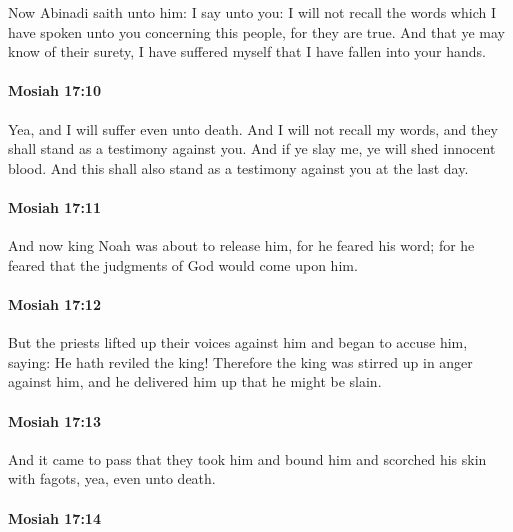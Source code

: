 			Now Abinadi saith unto him:
			I say unto you:
			I will not recall the words
			which I have spoken unto you concerning this people,
			for they are true.
			And that ye may know of their surety,
			I have suffered myself that I have fallen into your hands.

		\paragraph{Mosiah 17:10} %
			\label{MOSIAH-17-10}

			Yea, and I will suffer even unto death.
			And I will not recall my words,
			and they shall stand as a testimony against you.
			And if ye slay me, ye will shed innocent blood.
			And this shall also stand as a testimony against you at the last day.

		\paragraph{Mosiah 17:11} %
			\label{MOSIAH-17-11}

			And now king Noah was about to release him, for he feared his word;
			for he feared that the judgments of God would come upon him.

		\paragraph{Mosiah 17:12} %
			\label{MOSIAH-17-12}

			But the priests lifted up their voices against him
			and began to accuse him, saying:
			He hath reviled the king!
			Therefore the king was stirred up in anger against him,
			and he delivered him up that he might be slain.

		\paragraph{Mosiah 17:13} %
			\label{MOSIAH-17-13}

			And it came to pass that they took him and bound him
			and scorched his skin with fagots,
			yea, even unto death.

		\paragraph{Mosiah 17:14} %
			\label{MOSIAH-17-14}

